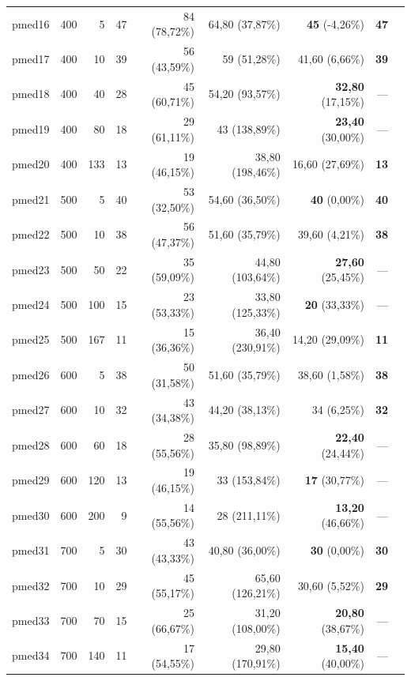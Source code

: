 \documentclass[12pt]{article}
\begin{document}
\begin{table}[ht]
{\begin{tabular}{lrrrrrrrr}
pmed16 & 400 & 5   & 47  & 84 (78,72\%)  & 64,80 (37,87\%)  & \textbf{45} (-4,26\%)    & \textbf{47} \\
pmed17 & 400 & 10  & 39  & 56 (43,59\%)  & 59 (51,28\%)     & 41,60 (6,66\%)           & \textbf{39} \\
pmed18 & 400 & 40  & 28  & 45 (60,71\%)  & 54,20 (93,57\%)  & \textbf{32,80} (17,15\%) & --- \\
pmed19 & 400 & 80  & 18  & 29 (61,11\%)  & 43 (138,89\%)    & \textbf{23,40} (30,00\%) & --- \\
pmed20 & 400 & 133 & 13  & 19 (46,15\%)  & 38,80 (198,46\%) & 16,60 (27,69\%)          & \textbf{13} \\
pmed21 & 500 & 5   & 40  & 53 (32,50\%)  & 54,60 (36,50\%)  & \textbf{40} (0,00\%)     & \textbf{40} \\
pmed22 & 500 & 10  & 38  & 56 (47,37\%)  & 51,60 (35,79\%)  & 39,60 (4,21\%)           & \textbf{38} \\
pmed23 & 500 & 50  & 22  & 35 (59,09\%)  & 44,80 (103,64\%) & \textbf{27,60} (25,45\%) & --- \\
pmed24 & 500 & 100 & 15  & 23 (53,33\%)  & 33,80 (125,33\%) & \textbf{20} (33,33\%)    & --- \\
pmed25 & 500 & 167 & 11  & 15 (36,36\%)  & 36,40 (230,91\%) & 14,20 (29,09\%)          & \textbf{11} \\
pmed26 & 600 & 5   & 38  & 50 (31,58\%)  & 51,60 (35,79\%)  & 38,60 (1,58\%)           & \textbf{38} \\
pmed27 & 600 & 10  & 32  & 43 (34,38\%)  & 44,20 (38,13\%)  & 34 (6,25\%)              & \textbf{32} \\
pmed28 & 600 & 60  & 18  & 28 (55,56\%)  & 35,80 (98,89\%)  & \textbf{22,40} (24,44\%) & --- \\
pmed29 & 600 & 120 & 13  & 19 (46,15\%)  & 33 (153,84\%)    & \textbf{17} (30,77\%)    & --- \\
pmed30 & 600 & 200 & 9   & 14 (55,56\%)  & 28 (211,11\%)    & \textbf{13,20} (46,66\%) & --- \\
pmed31 & 700 & 5   & 30  & 43 (43,33\%)  & 40,80 (36,00\%)  & \textbf{30} (0,00\%)     & \textbf{30} \\
pmed32 & 700 & 10  & 29  & 45 (55,17\%)  & 65,60 (126,21\%) & 30,60 (5,52\%)           & \textbf{29} \\
pmed33 & 700 & 70  & 15  & 25 (66,67\%)  & 31,20 (108,00\%) & \textbf{20,80} (38,67\%) & --- \\
pmed34 & 700 & 140 & 11  & 17 (54,55\%)  & 29,80 (170,91\%) & \textbf{15,40} (40,00\%) & --- \\

\end{tabular}}
\end{table}
\end{document}
